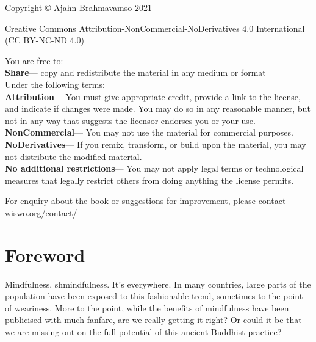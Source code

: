 \documentclass[12pt, openany]{book}
\begin{document}
\newpage

{\footnotesize
\noindent Copyright © Ajahn Brahmavamso 2021

\medskip

\noindent Creative Commons Attribution-NonCommercial-NoDerivatives 4.0 International (CC BY-NC-ND 4.0) 

\medskip

\noindent You are free to: \\
\noindent \textbf{Share}— copy and redistribute the material in any medium or format \\
\noindent Under the following terms: \\
\noindent \textbf{Attribution}— You must give appropriate credit, provide a link to the license, and indicate if changes were made. You may do so in any reasonable manner, but not in any way that suggests the licensor endorses you or your use. \\
\noindent \textbf{NonCommercial}— You may not use the material for commercial purposes. \\
\noindent \textbf{NoDerivatives}— If you remix, transform, or build upon the material, you may not distribute the modified material. \\
\noindent \textbf{No additional restrictions}— You may not apply legal terms or technological measures that legally restrict others from doing anything the license permits. 

\medskip

\noindent For enquiry about the book or suggestions for improvement, please contact \href{https://wiswo.org/contact/}{wiswo.org/contact/} 
}

\newpage

\tableofcontents

\newpage





\chapter{Foreword} 

Mindfulness, shmindfulness. It’s everywhere. In many countries, large parts of the population have been exposed to this fashionable trend, sometimes to the point of weariness. More to the point, while the benefits of mindfulness have been publicised with much fanfare, are we really getting it right? Or could it be that we are missing out on the full potential of this ancient Buddhist practice? 
\end{document}
